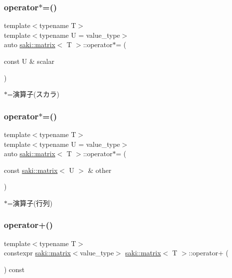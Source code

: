\subsubsection{\texorpdfstring{operator$\ast$=()}{operator*=()}\hspace{0.1cm}{\footnotesize\ttfamily [1/2]}}
{\footnotesize\ttfamily template$<$typename T$>$ \\
template$<$typename U  = value\+\_\+type$>$ \\
auto \mbox{\hyperlink{classsaki_1_1matrix}{saki\+::matrix}}$<$ T $>$\+::operator$\ast$= (\begin{DoxyParamCaption}\item[{const U \&}]{scalar }\end{DoxyParamCaption})\hspace{0.3cm}{\ttfamily [inline]}}



$\ast$=演算子(スカラ) 

\mbox{\label{classsaki_1_1matrix_acb32e13e61d31a15341fbf2996f6428b}} 
\subsubsection{\texorpdfstring{operator$\ast$=()}{operator*=()}\hspace{0.1cm}{\footnotesize\ttfamily [2/2]}}
{\footnotesize\ttfamily template$<$typename T$>$ \\
template$<$typename U  = value\+\_\+type$>$ \\
auto \mbox{\hyperlink{classsaki_1_1matrix}{saki\+::matrix}}$<$ T $>$\+::operator$\ast$= (\begin{DoxyParamCaption}\item[{const \mbox{\hyperlink{classsaki_1_1matrix}{saki\+::matrix}}$<$ U $>$ \&}]{other }\end{DoxyParamCaption})\hspace{0.3cm}{\ttfamily [inline]}}



$\ast$=演算子(行列) 

\mbox{\label{classsaki_1_1matrix_ada12f77277660f640f46c9bc7e67c04c}} 
\subsubsection{\texorpdfstring{operator+()}{operator+()}}
{\footnotesize\ttfamily template$<$typename T$>$ \\
constexpr \mbox{\hyperlink{classsaki_1_1matrix}{saki\+::matrix}}$<$value\+\_\+type$>$ \mbox{\hyperlink{classsaki_1_1matrix}{saki\+::matrix}}$<$ T $>$\+::operator+ (\begin{DoxyParamCaption}{ }\end{DoxyParamCaption}) const\hspace{0.3cm}{\ttfamily [inline]}}



